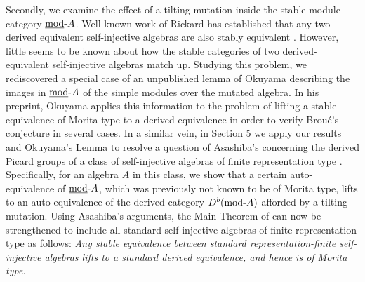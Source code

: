 \documentclass{amsart}
\begin{document}
 Secondly, we examine the effect of a tilting mutation inside the stable module category $\mbox{\underline{mod}-} A$.  Well-known work of Rickard has established that any two derived equivalent self-injective algebras are also stably equivalent  \cite{DCSE}.  However, little seems to be known about how the stable categories of two derived-equivalent self-injective algebras match up.  Studying this problem, we rediscovered a special case of an unpublished lemma of Okuyama \cite{Oku} describing the images in $\mbox{\underline{mod}-} A$ of the simple modules over the mutated algebra.   %
 In his preprint, Okuyama applies this information to the problem of lifting a stable equivalence of Morita type to a derived equivalence in order to verify Brou\'{e}'s conjecture in several cases.  %
   In a similar vein, in Section 5 we apply our results and Okuyama's Lemma to resolve a question of Asashiba's concerning the derived Picard groups of a class of self-injective algebras of finite representation type \cite{Asa2}.  Specifically, for an algebra $A$ in this class, we show that a certain auto-equivalence of $\mbox{\underline{mod}-} A$, which was previously not known to be of Morita type, lifts to an auto-equivalence of the derived category $D^b(\mbox{mod-} A)$ afforded by a tilting mutation.  Using Asashiba's arguments, the Main Theorem of \cite{Asa2} can now be strengthened to include all standard self-injective algebras of finite representation type as follows:
{\it  Any stable equivalence between standard representation-finite self-injective algebras lifts to a standard derived equivalence, and hence is of Morita type.}
   
\end{document}
